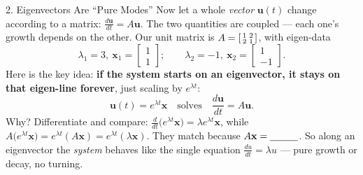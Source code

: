 \documentclass[10pt]{article}
\newcommand{\uu}{\mathbf{u}}
\newcommand{\xx}{\mathbf{x}}
\begin{document}
\begin{notesbox}{2. Eigenvectors Are ``Pure Modes''}
Now let a whole \emph{vector} $\uu(t)$ change according to a matrix: $\frac{d\uu}{dt}=A\uu$. The two quantities
are coupled --- each one's growth depends on the other. Our unit matrix is
$A=\begin{bsmallmatrix}1&2\\2&1\end{bsmallmatrix}$, with eigen-data
\[
  \lambda_1=3,\ \xx_1=\begin{bmatrix}1\\1\end{bmatrix};\qquad
  \lambda_2=-1,\ \xx_2=\begin{bmatrix}1\\-1\end{bmatrix}.
\]
Here is the key idea: \textbf{if the system starts on an eigenvector, it stays on that eigen-line forever},
just scaling by $e^{\lambda t}$:
\[
  \uu(t)=e^{\lambda t}\xx \quad\text{solves}\quad \frac{d\uu}{dt}=A\uu.
\]
Why? Differentiate and compare: $\frac{d}{dt}\big(e^{\lambda t}\xx\big)=\lambda e^{\lambda t}\xx$, while
$A\big(e^{\lambda t}\xx\big)=e^{\lambda t}(A\xx)=e^{\lambda t}(\lambda\xx)$. They match because
$A\xx=\blank{1.0cm}$. So along an eigenvector the \emph{system} behaves like the single equation
$\frac{du}{dt}=\lambda u$ --- pure growth or decay, no turning.
\end{notesbox}
\end{document}
